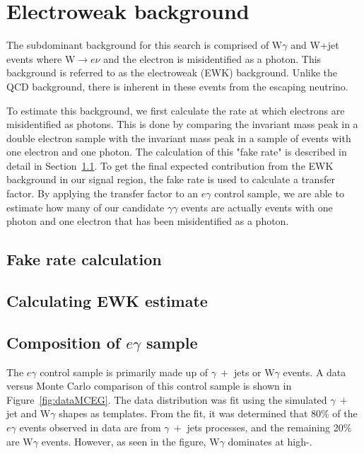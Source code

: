 \section{Electroweak background}
\label{sec:EWK}

The subdominant background for this search is comprised of W$\gamma$ and W+jet events where W$\rightarrow e \nu$ and the electron is misidentified as a photon. This background is referred to as the electroweak (EWK) background. Unlike the QCD background, there is inherent \ETmiss in these events from the escaping neutrino. 

To estimate this background, we first calculate the rate at which electrons are misidentified as photons. This is done by comparing the invariant mass peak in a double electron sample with the invariant mass peak in a sample of events with one electron and one photon. The calculation of this "fake rate" is described in detail in Section~\ref{sec:fakeRate}. To get the final expected contribution from the EWK background in our signal region, the fake rate is used to calculate a transfer factor. By applying the transfer factor to an $e\gamma$ control sample, we are able to estimate how many of our candidate $\gamma\gamma$ events are actually events with one photon and one electron that has been misidentified as a photon. 

\subsection{Fake rate calculation}
\label{sec:fakeRate}

\subsection{Calculating EWK estimate}

\subsection{Composition of $e\gamma$ sample}
The $e\gamma$ control sample is primarily made up of $\gamma~+$ jets or W$\gamma$ events. A data versus Monte Carlo comparison of this control sample is shown in Figure~\ref{fig:dataMCEG}. The data distribution was fit using the simulated $\gamma~+$ jet and W$\gamma$ shapes as templates. From the fit, it was determined that 80\% of the $e\gamma$ events observed in data are from $\gamma~+$ jets  processes, and the remaining 20\% are W$\gamma$ events. However, as seen in the figure, W$\gamma$ dominates at high-\ETmiss.

